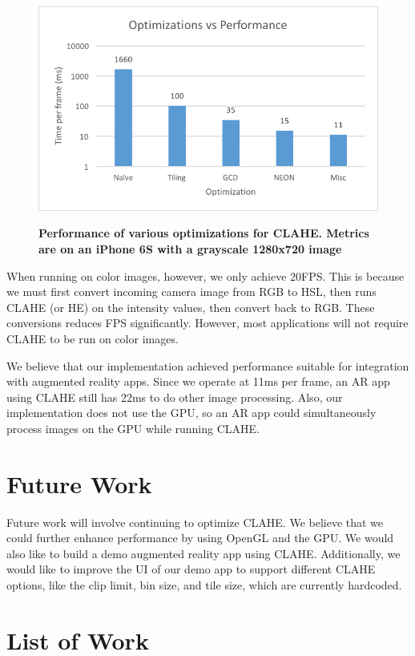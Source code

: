\documentclass[10pt,twocolumn,letterpaper]{article}
\begin{document}
\begin{figure}[h]
\caption{\textbf{Performance of various optimizations for CLAHE. Metrics are on an iPhone 6S with a grayscale 1280x720 image}}
\includegraphics[width=\linewidth]{perf.png}
\label{fig:perf}
\end{figure}

When running on color images, however, we only achieve 20FPS. This is because we must first convert incoming camera image from RGB to HSL, then runs CLAHE (or HE) on the intensity values, then convert back to RGB. These conversions reduces FPS significantly. However, most applications will not require CLAHE to be run on color images.

We believe that our implementation achieved performance suitable for integration with augmented reality apps. Since we operate at 11ms per frame, an AR app using CLAHE still has 22ms to do other image processing. Also, our implementation does not use the GPU, so an AR app could simultaneously process images on the GPU while running CLAHE. 

\section{Future Work}
Future work will involve continuing to optimize CLAHE. We believe that we could further enhance performance by using OpenGL and the GPU. We would also like to build a demo augmented reality app using CLAHE. Additionally, we would like to improve the UI of our demo app to support different CLAHE options, like the clip limit, bin size, and tile size, which are currently hardcoded. 

\section{List of Work}
\end{document}
